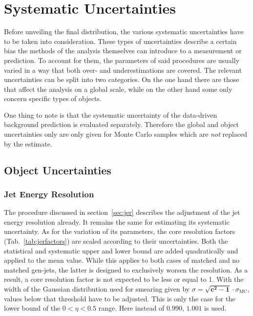 \chapter{Systematic Uncertainties}
\label{cha:systematics}

Before unveiling the final distribution, the various systematic uncertainties have to be taken into consideration. These types of uncertainties describe a certain bias the methods of the analysis themselves can introduce to a measurement or prediction. To account for them, the parameters of said procedures are usually varied in a way that both over- and underestimations are covered. The relevant uncertainties can be split into two categories. On the one hand there are those that affect the analysis on a global scale, while on the other hand some only concern specific types of objects.

One thing to note is that the systematic uncertainty of the data-driven background prediction is evaluated separately. Therefore the global and object uncertainties only are only given for Monte Carlo samples which are \textit{not} replaced by the estimate.

\section{Object Uncertainties}
\label{sec:objsys}

\subsection{Jet Energy Resolution}
\label{sec:jersys}

The procedure discussed in section~\ref{sec:jer} describes the adjustment of the jet energy resolution already. It remains the same for estimating its systematic uncertainty. As for the variation of its parameters, the core resolution factors (Tab.~\ref{tab:jerfactors}) are scaled according to their uncertainties. Both the statistical and systematic upper and lower bound are added quadratically and applied to the mean value. While this applies to both cases of matched and no matched gen-jets, the latter is designed to exclusively worsen the resolution. As a result, a core resolution factor is not expected to be less or equal to 1. With the width of the Gaussian distribution used for smearing given by $\sigma = \mathbf{\sqrt{c^2-1}} \cdot \sigma_{\text{MC}}$, values below that threshold have to be adjusted. This is only the case for the lower bound of the $0 < \eta < 0.5$ range. Here instead of $0.990$, $1.001$ is used. 

